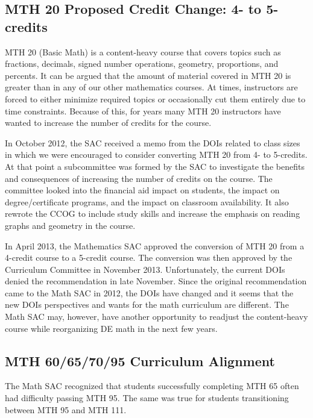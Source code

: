 \subsection{MTH 20 Proposed Credit Change: 4- to 5-credits}
MTH 20 (Basic Math) is a content-heavy course that covers topics such as fractions, decimals, signed number operations, geometry, proportions, and percents.  It can be argued that the amount of material covered in MTH 20 is greater than in any of our other mathematics courses.  At times, instructors are forced to either minimize required topics or occasionally cut them entirely due to time constraints.  Because of this, for years many MTH 20 instructors have wanted to increase the number of credits for the course.  

In October 2012, the SAC received a memo from the DOIs related to class sizes in which we were encouraged to consider converting MTH 20 from 4- to 5-credits.  At that point a subcommittee was formed by the SAC to investigate the benefits and consequences of increasing the number of credits on the course.  The committee looked into the financial aid impact on students, the impact on degree/certificate programs, and the impact on classroom availability.  It also rewrote the CCOG to include study skills and increase the emphasis on reading graphs and geometry in the course.  

In April 2013, the Mathematics SAC approved the conversion of MTH 20 from a 4-credit course to a 5-credit course.  The conversion was then approved by the Curriculum Committee in November 2013.  Unfortunately, the current DOIs denied the recommendation in late November.  Since the original recommendation came to the Math SAC in 2012, the DOIs have changed and it seems that the new DOIs perspectives and wants for the math curriculum are different.  The Math SAC may, however, have another opportunity to readjust the content-heavy course while reorganizing DE math in the next few years. 

\subsection{MTH 60/65/70/95 Curriculum Alignment}
The Math SAC recognized that students successfully completing MTH 65 often had difficulty passing MTH 95.  The same was true for students transitioning between MTH 95 and MTH 111.

